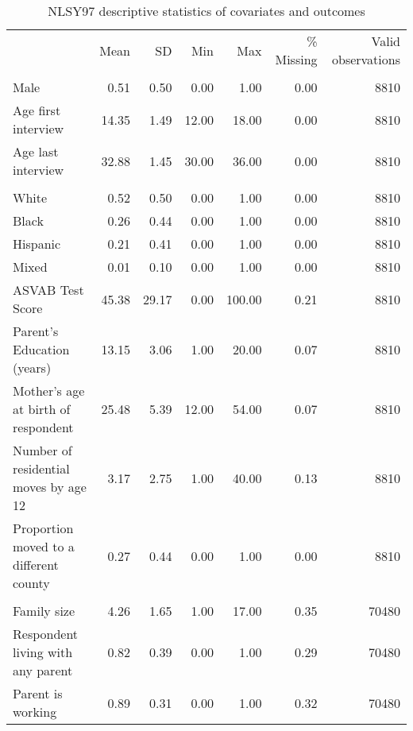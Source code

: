 \begin{table}[htp]
\setlength{\tabcolsep}{3pt}
\renewcommand{\arraystretch}{1}
\centering
\begin{threeparttable}
\centering
\caption{NLSY97 descriptive statistics of covariates and outcomes} 
\label{tab:descriptive}
\begingroup\fontsize{9pt}{10pt}\selectfont
\begin{tabular}{lrrrrrr}
  \hline
\addlinespace
  & Mean & SD & Min & Max & \% Missing & Valid observations \\
\addlinespace
 \hline
  \addlinespace
\multicolumn{7}{l}{\textbf{\textit{Time-invariant covariates}}} \\
\addlinespace
Male & 0.51 & 0.50 & 0.00 & 1.00 & 0.00 & 8810 \\ 
  Age first interview & 14.35 & 1.49 & 12.00 & 18.00 & 0.00 & 8810 \\ 
  Age last interview & 32.88 & 1.45 & 30.00 & 36.00 & 0.00 & 8810 \\ 
   \addlinespace
\multicolumn{7}{l}{\textit{Race-Ethnicity}} \\
\quad White & 0.52 & 0.50 & 0.00 & 1.00 & 0.00 & 8810 \\ 
  \quad Black & 0.26 & 0.44 & 0.00 & 1.00 & 0.00 & 8810 \\ 
  \quad Hispanic & 0.21 & 0.41 & 0.00 & 1.00 & 0.00 & 8810 \\ 
  \quad Mixed & 0.01 & 0.10 & 0.00 & 1.00 & 0.00 & 8810 \\ 
   \addlinespace
ASVAB Test Score & 45.38 & 29.17 & 0.00 & 100.00 & 0.21 & 8810 \\ 
  Parent's Education (years) & 13.15 & 3.06 & 1.00 & 20.00 & 0.07 & 8810 \\ 
  Mother's age at birth of respondent & 25.48 & 5.39 & 12.00 & 54.00 & 0.07 & 8810 \\ 
  Number of residential moves by age 12 & 3.17 & 2.75 & 1.00 & 40.00 & 0.13 & 8810 \\ 
  Proportion moved to a different county & 0.27 & 0.44 & 0.00 & 1.00 & 0.00 & 8810 \\ 
   \addlinespace
\multicolumn{7}{l}{\textbf{\textit{Time-variant covariates}}} \\
\addlinespace
Family size & 4.26 & 1.65 & 1.00 & 17.00 & 0.35 & 70480 \\ 
  Respondent living with any parent & 0.82 & 0.39 & 0.00 & 1.00 & 0.29 & 70480 \\ 
  Parent is working & 0.89 & 0.31 & 0.00 & 1.00 & 0.32 & 70480 \\ 

\end{tabular}
\end{threeparttable}
\end{table}
